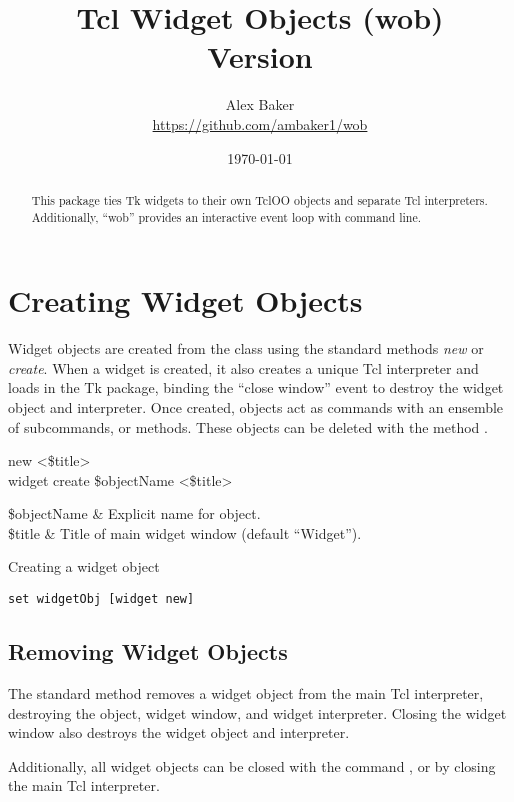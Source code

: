 \documentclass{article}
\title{\Huge Tcl Widget Objects (wob)\\\small Version \version}
\author{Alex Baker\\\small\url{https://github.com/ambaker1/wob}}
\date{\small\today}
\renewcommand{\^}[1]{\textsuperscript{#1}}
\renewcommand{\_}[1]{\textsubscript{#1}}
\begin{document}
\maketitle
\begin{abstract}
\begin{center}
This package ties Tk widgets to their own TclOO objects and separate Tcl interpreters. Additionally, ``wob'' provides an interactive event loop with command line.
\end{center}
\end{abstract}

\clearpage
\section{Creating Widget Objects}
Widget objects are created from the  class using the standard methods \textit{new} or \textit{create}. 
When a widget is created, it also creates a unique Tcl interpreter and loads in the Tk package, binding the ``close window'' event to destroy the widget object and interpreter.
Once created,  objects act as commands with an ensemble of subcommands, or methods. 
These objects can be deleted with the method .
\begin{syntax}
   	 new <\$title> \\
   	widget create \$objectName <\$title>
\end{syntax}
\begin{args}
   	\$objectName & Explicit name for object. \\
   	\$title & Title of main widget window (default ``Widget'').
\end{args}
\begin{example}{Creating a widget object}
\begin{lstlisting}
set widgetObj [widget new]
\end{lstlisting}
\end{example}
\subsection{Removing Widget Objects}
The standard method  removes a widget object from the main Tcl interpreter, destroying the object, widget window, and widget interpreter. 
Closing the widget window also destroys the widget object and interpreter.

\begin{syntax}
\end{syntax}
Additionally, all widget objects can be closed with the command , or by closing the main Tcl interpreter.
\begin{syntax}
\end{syntax}
\end{document}
